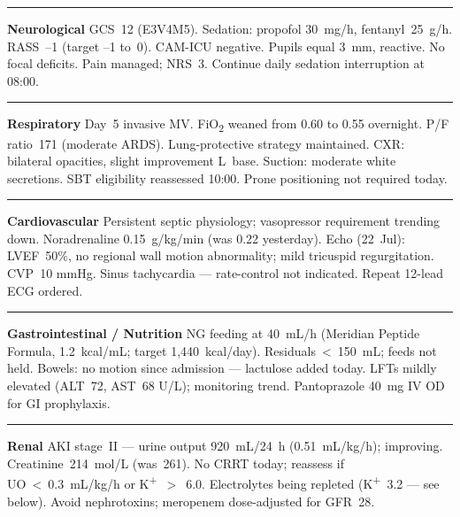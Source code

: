 \documentclass[11pt,a4paper]{scrartcl}
\newcommand{\organ}[2]{%
  \noindent
  {\color{MedTeal}\rule{3pt}{9pt}}\enspace
  {\sffamily\bfseries\small\color{MedNavy}#1}\enspace
  {\small\color{TextGray}#2}\par\vspace{1pt}%
}
\begin{document}
\vspace{8pt}

\noindent
\begin{tcolorbox}[sectionbox,
  title={\faBrain\enspace Organ Systems Review — 24 July 2026}]

  \noindent
  \begin{minipage}[t]{0.47\linewidth}

    \organ{Neurological}{GCS~12 (E3V4M5). Sedation: propofol 30~mg/h,
      fentanyl~25~\textmu{}g/h. RASS~--1 (target --1 to~0). CAM-ICU negative.
      Pupils equal 3~mm, reactive. No focal deficits. Pain managed; NRS~3.
      Continue daily sedation interruption at 08:00.}

    \vspace{4pt}

    \organ{Respiratory}{Day~5 invasive MV. FiO\textsubscript{2} weaned from
      0.60 to 0.55 overnight. P/F ratio~171 (moderate ARDS). Lung-protective
      strategy maintained. CXR: bilateral opacities, slight improvement L~base.
      Suction: moderate white secretions. SBT eligibility reassessed 10:00.
      Prone positioning not required today.}

    \vspace{4pt}

    \organ{Cardiovascular}{Persistent septic physiology; vasopressor
      requirement trending down. Noradrenaline 0.15~\textmu{}g/kg/min
      (was 0.22 yesterday). Echo (22~Jul): LVEF~50\%, no regional wall motion
      abnormality; mild tricuspid regurgitation. CVP~10 mmHg. Sinus
      tachycardia — rate-control not indicated. Repeat 12-lead ECG ordered.}

    \vspace{4pt}

    \organ{Gastrointestinal / Nutrition}{NG feeding at 40~mL/h
      (Meridian Peptide Formula, 1.2~kcal/mL; target 1{,}440~kcal/day).
      Residuals~\textless~150~mL; feeds not held. Bowels: no motion since
      admission — lactulose added today. LFTs mildly elevated (ALT~72,
      AST~68 U/L); monitoring trend. Pantoprazole 40~mg IV OD for GI
      prophylaxis.}

  \end{minipage}%
  \hfill
  \begin{minipage}[t]{0.47\linewidth}

    \organ{Renal}{AKI stage~II — urine output 920~mL/24~h (0.51~mL/kg/h);
      improving. Creatinine~214~\textmu{}mol/L (was~261). No CRRT today;
      reassess if UO~\textless~0.3~mL/kg/h or K\textsuperscript{+}~$>$~6.0.
      Electrolytes being repleted (K\textsuperscript{+}~3.2 — see below).
      Avoid nephrotoxins; meropenem dose-adjusted for GFR~28.}


\end{minipage}
\end{tcolorbox}
\end{document}
